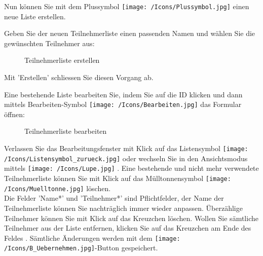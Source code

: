 Nun können Sie mit dem Plussymbol \texttt{[image: /Icons/Plussymbol.jpg]}  einen neue Liste erstellen. 

\vspace{\baselineskip}

Geben Sie der neuen Teilnehmerliste einen passenden Namen und wählen Sie die gewünschten Teilnehmer aus:

\begin{figure}[H]
\caption{Teilnehmerliste erstellen}
\end{figure}

Mit 'Erstellen' schliessen Sie diesen Vorgang ab. 

\vspace{\baselineskip}

Eine bestehende Liste bearbeiten Sie, indem Sie auf die ID  klicken und dann mittels Bearbeiten-Symbol \texttt{[image: /Icons/Bearbeiten.jpg]}  das Formular öffnen:

\begin{figure}[H]
\caption{Teilnehmerliste bearbeiten}
\end{figure}

Verlassen Sie das Bearbeitungsfenster mit Klick auf das Listensymbol \texttt{[image: /Icons/Listensymbol\_zurueck.jpg]}  oder wechseln Sie in den Ansichtsmodus mittels \texttt{[image: /Icons/Lupe.jpg]} . Eine bestehende und nicht mehr verwendete Teilnehmerliste können Sie mit Klick auf das Mülltonnensymbol \texttt{[image: /Icons/Muelltonne.jpg]}  löschen.\\
Die Felder 'Name*'  und 'Teilnehmer*'  sind Pflichtfelder, der Name der Teilnehmerliste können Sie nachträglich immer wieder anpassen. Überzählige Teilnehmer können Sie mit Klick auf das Kreuzchen  löschen. Wollen Sie sämtliche Teilnehmer aus der Liste entfernen, klicken Sie auf das Kreuzchen am Ende des Feldes . Sämtliche Änderungen werden mit dem \texttt{[image: /Icons/B\_Uebernehmen.jpg]}-Button  gespeichert.

